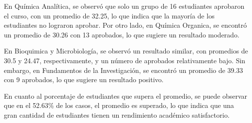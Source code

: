 En Química Analítica, se observó que solo un grupo de 16 estudiantes aprobaron el curso, con un promedio de 32.25, lo que indica que la mayoría de los estudiantes no lograron aprobar. Por otro lado, en Química Organica, se encontró un promedio de 30.26 con 13 aprobados, lo que sugiere un resultado moderado.

En Bioquimica y Microbiología, se observó un resultado similar, con promedios de 30.5 y 24.47, respectivamente, y un número de aprobados relativamente bajo. Sin embargo, en Fundamentos de la Investigación, se encontró un promedio de 39.33 con 9 aprobados, lo que sugiere un resultado positivo.

En cuanto al porcentaje de estudiantes que supera el promedio, se puede observar que en el 52.63\% de los casos, el promedio es superado, lo que indica que una gran cantidad de estudiantes tienen un rendimiento académico satisfactorio.

